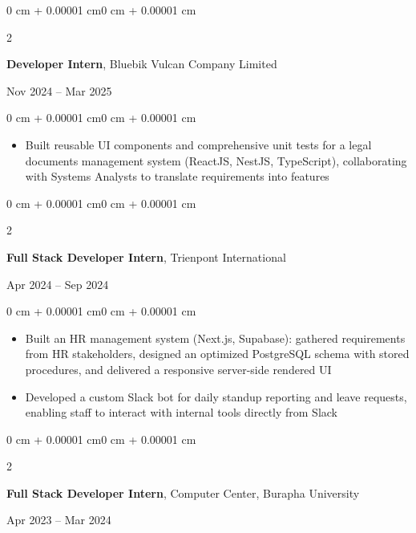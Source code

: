 \documentclass[10pt, letterpaper]{article}
\newenvironment{highlights}{
    \begin{itemize}[
        topsep=0.055 cm,
        parsep=0.055 cm,
        partopsep=0pt,
        itemsep=0pt,
        leftmargin=0.4 cm + 10pt
    ]
}{
    \end{itemize}
}
\newenvironment{onecolentry}{
    \begin{adjustwidth}{0 cm + 0.00001 cm}{0 cm + 0.00001 cm}
}{
    \end{adjustwidth}
}
\newenvironment{twocolentry}[2][]{
    \onecolentry
    \def\secondColumn{#2}
    \setcolumnwidth{\fill, 4.5 cm}
    \begin{paracol}{2}
}{
    \switchcolumn \raggedleft \secondColumn
    \end{paracol}
    \endonecolentry
}
\begin{document}
        \vspace{0.24 cm}

        \begin{twocolentry}{
            Nov 2024 -- Mar 2025
        }
            \large\textbf{Developer Intern}, Bluebik Vulcan Company Limited
        \end{twocolentry}

        \vspace{0.08 cm}
        \begin{onecolentry}
            \begin{highlights}
                \item Built reusable UI components and comprehensive unit tests for a legal documents management system (ReactJS, NestJS, TypeScript), collaborating with Systems Analysts to translate requirements into features
            \end{highlights}
        \end{onecolentry}

        \vspace{0.24 cm}

        \begin{twocolentry}{
            Apr 2024 -- Sep 2024
        }
            \large\textbf{Full Stack Developer Intern}, Trienpont International
        \end{twocolentry}

        \vspace{0.08 cm}
        \begin{onecolentry}
            \begin{highlights}
                \item Built an HR management system (Next.js, Supabase): gathered requirements from HR stakeholders, designed an optimized PostgreSQL schema with stored procedures, and delivered a responsive server-side rendered UI
                \item Developed a custom Slack bot for daily standup reporting and leave requests, enabling staff to interact with internal tools directly from Slack
            \end{highlights}
        \end{onecolentry}

        \vspace{0.24 cm}

        \begin{twocolentry}{
            Apr 2023 -- Mar 2024
        }
            \large\textbf{Full Stack Developer Intern}, Computer Center, Burapha University
        \end{twocolentry}
\end{document}
